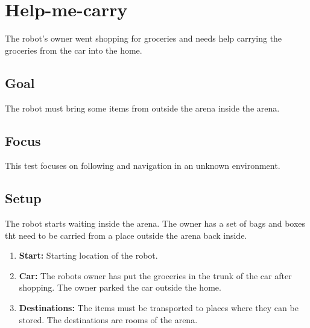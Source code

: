 \section{Help-me-carry}
The robot's owner went shopping for groceries and needs help carrying the groceries from the car into the home.

\subsection{Goal}
The robot must bring some items from outside the arena inside the arena.

\subsection{Focus}
This test focuses on following and navigation in an unknown environment. 

\subsection{Setup}
The robot starts waiting inside the arena. 
The owner has a set of bags and boxes tht need to be carried from a place outside the arena back inside. 

\begin{enumerate}
\item \textbf{Start:} Starting location of the robot. %
\item \textbf{Car:} The robots owner has put the groceries in the trunk of the car after shopping. The owner parked the car outside the home.
\item \textbf{Destinations:} The items must be transported to places where they can be stored. The destinations are rooms of the arena. 
\end{enumerate}


